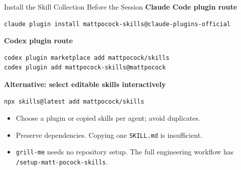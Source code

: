 \begin{frame}[fragile]{Install the Skill Collection Before the Session}
\small
\textbf{Claude Code plugin route}
\begin{verbatim}
claude plugin install mattpocock-skills@claude-plugins-official
\end{verbatim}
\textbf{Codex plugin route}
\begin{verbatim}
codex plugin marketplace add mattpocock/skills
codex plugin add mattpocock-skills@mattpocock
\end{verbatim}
\textbf{Alternative: select editable skills interactively}
\begin{verbatim}
npx skills@latest add mattpocock/skills
\end{verbatim}
\begin{itemize}
\item Choose a plugin or copied skills per agent; avoid duplicates.
\item Preserve dependencies. Copying one \texttt{SKILL.md} is insufficient.
\item \texttt{grill-me} needs no repository setup. The full engineering workflow has \texttt{/setup-matt-pocock-skills}.
\end{itemize}
\par\vfill
{}
\end{frame}

